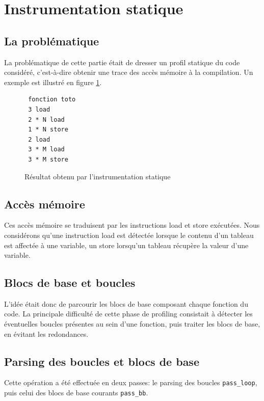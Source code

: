 \section{Instrumentation statique}

\subsection{La problématique}

La problématique de cette partie était de dresser un profil statique du code considéré, c'est-à-dire obtenir une trace des accès mémoire à la compilation. Un exemple est illustré en figure \ref{fig:static_result}.

\begin{figure}[here]
  \centering
\begin{verbatim}
 fonction toto
 3 load
 2 * N load
 1 * N store
 2 load
 3 * M load
 3 * M store
\end{verbatim}
  \caption{Résultat obtenu par l'instrumentation statique}
  \label{fig:static_result}
\end{figure}

\subsection{Accès mémoire}

Ces accès mémoire se traduisent par les instructions load et store exécutées. Nous considérons qu'une instruction load est détectée lorsque le contenu d'un tableau est affectée à une variable, un store lorsqu'un tableau récupère la valeur d'une variable.\\

\subsection{Blocs de base et boucles}

L'idée était donc de parcourir les blocs de base composant chaque fonction du code. La principale difficulté de cette phase de profiling consistait à détecter les éventuelles boucles présentes au sein d'une fonction, puis traiter les blocs de base, en évitant les redondances.

\subsection{Parsing des boucles et blocs de base}

Cette opération a été effectuée en deux passes: le parsing des boucles \verb#pass_loop#, puis celui des blocs de base courants \verb#pass_bb#.\\

